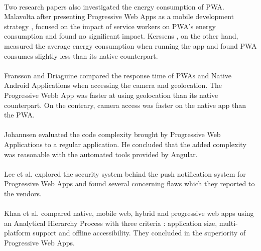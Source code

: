 \documentclass{kththesis}
\begin{document}
\paragraph{}
Two research papers also investigated the energy consumption of PWA. Malavolta after presenting Progressive Web Apps as a mobile development strategy \cite{malavolta2016beyond}, focused on the impact of service workers on PWA's energy consumption and found no significant impact\cite{SW_and_energy}. Kerssens \cite{PWAapplicability}, on the other hand, measured the average energy consumption when running the app and found PWA consumes slightly less than its native counterpart. 

\paragraph{}
Fransson and Driaguine \cite{PWAbc_responsetime} compared the response time of PWAs and Native Android Applications when accessing the camera and geolocation. The Progressive Webb App was faster at using geolocation than its native counterpart. On the contrary, camera access was faster on the native app than the PWA.

\paragraph{}
Johannsen \cite{JohannsenFabian2018PWAa} evaluated the code complexity brought by Progressive Web Applications to a regular application. He concluded that the added complexity was reasonable with the automated tools provided by Angular. 

\paragraph{}
Lee et al. \cite{Pride_Prejudice} explored the security system behind the push notification system for Progressive Web Apps and found several concerning flaws which they reported to the vendors.

\paragraph{}
Khan et al. \cite{pwa_ahp} compared native, mobile web, hybrid and progressive web apps using an Analytical Hierarchy Process with three criteria : application size, multi-platform support and offline accessibility. They concluded in the superiority of Progressive Web Apps.

\end{document}
